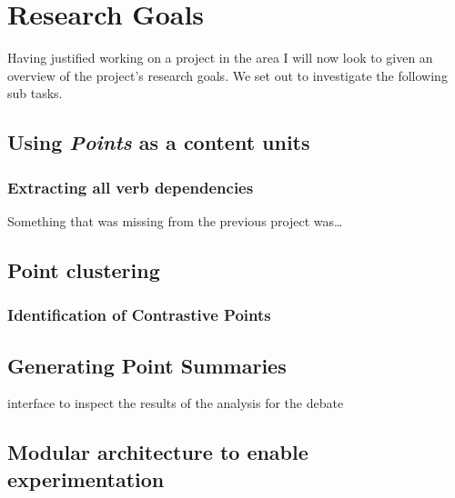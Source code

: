\chapter{Research Goals\label{chap:res-goals}}
  Having justified working on a project in the area I will now look to given an overview of the project's research goals. We set out to investigate the following sub tasks.

  \section{Using \textit{Points} as a content units}
    \subsection{Extracting all verb dependencies}
      Something that was missing from the previous project was\dots
  \section{Point clustering}
    \subsection{Identification of Contrastive Points}
  \section{Generating Point Summaries}
    interface to inspect the results of the analysis for the debate
  \section{Modular architecture to enable experimentation}
